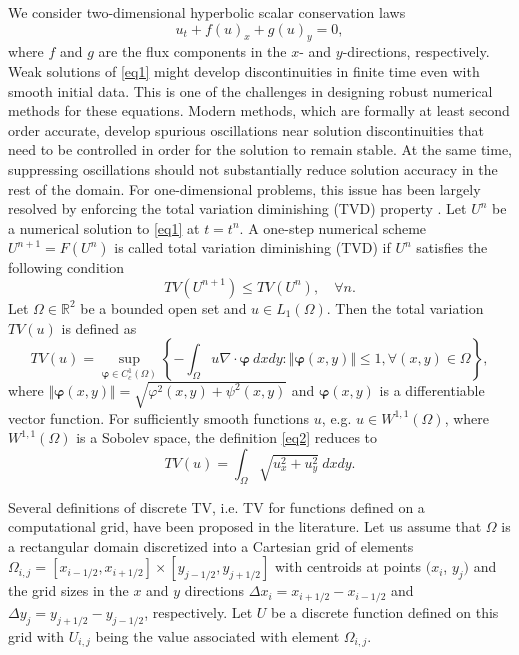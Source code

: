 \documentclass[reqno,a4paper,12pt]{amsart}
\begin{document}
We consider two-dimensional hyperbolic scalar conservation laws
\begin{equation}
    u_t + f(u)_x + g(u)_y = 0,
    \label{eq1}
\end{equation}
where $f$ and $g$ are the flux components in the $x$- and $y$-directions, respectively. Weak solutions of \eqref{eq1} might develop discontinuities in finite time even with smooth initial data. This is one of the challenges in designing robust numerical methods for these equations. Modern methods, which are formally at least second order accurate, develop spurious oscillations near solution discontinuities that need to be controlled in order for the solution to remain stable. At the same time, suppressing oscillations should not substantially reduce solution accuracy in the rest of the domain. For one-dimensional problems, this issue has been largely resolved by enforcing the total variation diminishing (TVD) property \cite{Harten}. Let $U^n$ be a numerical solution to \eqref{eq1} at $t = t^n$. A one-step numerical scheme $U^{n+1} = F(U^{n})$ is called total variation diminishing (TVD) if $U^n$ satisfies the following condition
\begin{equation}
    TV(U^{n+1}) \leq TV(U^n), \quad \forall n. 
    \label{eq5}
\end{equation}
Let $\Omega \in \mathbb{R}^2$ be a bounded open set and $u \in L_1(\Omega)$. Then the total variation $TV(u)$ is defined as  \cite{Evans} 
\begin{equation}
    TV(u) = \sup_{\bm{\varphi} \in C_c^{1}(\Omega)} \left\{ -\int_{\Omega} u \nabla \cdot \bm{\varphi} ~dx dy : \Vert \bm{\varphi}(x,y) \Vert \leq 1, \forall (x,y) \in \Omega \right\},
    \label{eq2}
\end{equation}
where $ \Vert \bm{\varphi}(x,y) \Vert = \sqrt{\varphi^2(x,y)+\psi^2(x,y)}$ and $\bm{\varphi}(x,y)$ is a differentiable vector function.
For sufficiently smooth  functions $u$, e.g. $u \in W^{1,1}(\Omega)$, where $W^{1,1}(\Omega)$ is a Sobolev space, the definition \eqref{eq2} reduces to
\begin{equation}
    TV(u) = \int_{\Omega} \sqrt{u_x^2 + u_y^2} ~dx dy .
    \label{TV}
\end{equation}

Several definitions of discrete TV, i.e. TV for functions defined on a computational grid, have been proposed in the literature. Let us assume that $\Omega$ is a rectangular domain discretized into a Cartesian grid of elements $\Omega_{i,j} = [x_{i-1/2},x_{i+1/2}] \times [y_{j-1/2},y_{j+1/2}]$ with centroids at points $(x_i$, $y_j)$ and the grid sizes in the $x$ and $y$ directions  $\Delta x_i =x_{i+1/2}-x_{i-1/2}$ and $\Delta y_{j} = y_{j+1/2}-y_{j-1/2}$, respectively. Let $U$ be a discrete function defined on this grid with $U_{i,j}$ being the value associated with element $\Omega_{i,j}$.
\end{document}
